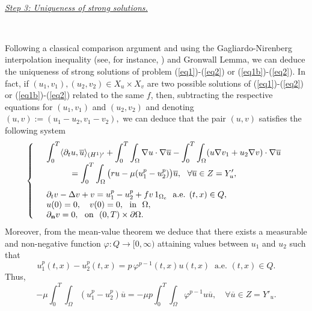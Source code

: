\documentclass[11pt,reqno]{amsart}%
\numberwithin{equation}{section}
\begin{document}
{%

\

 {\it \underline{Step 3: Uniqueness of strong solutions.}}
 
 \
 
Following a classical comparison argument and using the Gagliardo-Nirenberg 
interpolation inequality (see, for instance, \cite{nirenberg}) and Gronwall Lemma, we can deduce the uniqueness of strong solutions
of problem (\ref{eq1})-(\ref{eq2}) or (\ref{eq1b})-(\ref{eq2}).  In fact, if $(u_1,v_1), (u_2,v_2)\in X_u\times X_v$ are two possible solutions of  (\ref{eq1})-(\ref{eq2}) or (\ref{eq1b})-(\ref{eq2})
related to the same $f$, then, subtracting the respective equations for $(u_1,v_1)$ and $(u_2,v_2)$ and denoting $(u,v):=(u_1-u_2,v_1-v_2),$ we can deduce that the pair $(u,v)$ satisfies the following system
\begin{equation}\label{U-1}
\left\{
\begin{array}{rl}
&\displaystyle\int_0^T\langle\partial_tu,\overline{u}\rangle_{(H^1)'}
+\int_0^T\int_\Omega\nabla u\cdot\nabla\overline{u}
-\displaystyle\int_0^T\int_\Omega(u\nabla v_1+u_2\nabla v)\cdot\nabla\overline{u}\\
&\ \ \ \ \ \ \ \ \ = \displaystyle\int_0^T\int_\Omega\big(ru-\mu(u_1^p-u_2^p)\big)\overline{u},\ \ \forall\overline{u}\in  Z=Y_u',\\
\noalign{\vspace{-1ex}}\\
 &\partial_tv-\Delta v+v=u_1^p-u_2^p+fv\,1_{\Omega_c}\ \mbox{ a.e. }(t,x)\in Q,\\
 &u(0)=0, \ \ \ v(0)=0,\ \mbox{ in }\ \Omega,\\
 &\partial_{\bf n}v=0,\ \mbox{ on }\ (0,T)\times\partial\Omega.
\end{array}
\right.
\end{equation}
Moreover, from the mean-value theorem we deduce that there exists a measurable and non-negative function $\varphi:Q\to [0,\infty)$ attaining  values between $u_1$ and $u_2$ such that
$$
u_1^p(t,x)-u_2^p(t,x)=p\,\varphi^{p-1}(t,x)u(t,x)\ \mbox{ a.e. }(t,x)\in Q.
$$
Thus,
\begin{equation}\label{U-1-1}
-\mu\int_0^T\int_\Omega(u_1^p-u_2^p)\overline{u}
=-\mu p\int_0^T\int_\Omega\varphi^{p-1}u\overline{u}, \quad \forall \overline{u}\in Z=Y'_u.
\end{equation}


}
\end{document}
